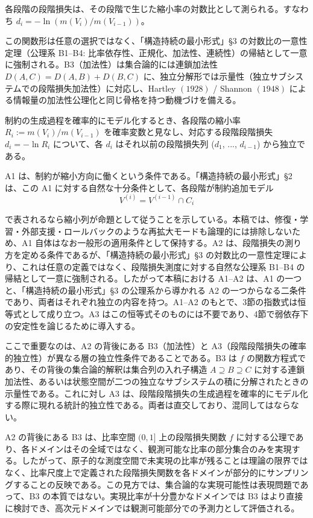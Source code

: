\documentclass[12pt,a4paper]{article}
\begin{document}
\begin{assumption}[A2]
各段階の段階損失は、その段階で生じた縮小率の対数比として測られる。すなわち
$d_i = -\ln(m(V_i)/m(V_{i-1}))$。

この関数形は任意の選択ではなく、「構造持続の最小形式」§3 の対数比の一意性定理（公理系 B1–B4: 比率依存性、正規化、加法性、連続性）の帰結として一意に強制される。B3（加法性）は集合論的には連鎖加法性
$D(A,C) = D(A,B) + D(B,C)$
に、独立分解形では示量性（独立サブシステムでの段階損失加法性）に対応し、Hartley $(1928)$ / Shannon $(1948)$ による情報量の加法性公理化と同じ骨格を持つ動機づけを備える。
\end{assumption}

\begin{assumption}[A3]
制約の生成過程を確率的にモデル化するとき、各段階の縮小率 $R_i := m(V_i)/m(V_{i-1})$ を確率変数と見なし、対応する段階段階損失 $d_i = -\ln R_i$ について、各 $d_i$ はそれ以前の段階損失列 ($d_1$, ..., $d_{i-1}$) から独立である。
\end{assumption}

A1 は、制約が縮小方向に働くという条件である。「構造持続の最小形式」§2 は、この A1 に対する自然な十分条件として、各段階が制約追加モデル \[
V^{(i)} = V^{(i-1)} ∩ C_{i}
\]

で表されるなら縮小列が命題として従うことを示している。本稿では、修復・学習・外部支援・ロールバックのような再拡大モードも論理的には排除しないため、A1 自体はなお一般形の適用条件として保持する。A2 は、段階損失の測り方を定める条件であるが、「構造持続の最小形式」§3 の対数比の一意性定理により、これは任意の定義ではなく、段階損失測度に対する自然な公理系 B1--B4 の帰結として一意に強制される。したがって本稿における A1--A2 は、A1 の一つと、「構造持続の最小形式」§3 の公理系から導かれる A2 の一つからなる二条件であり、両者はそれぞれ独立の内容を持つ。A1--A2 のもとで、3節の指数式は恒等式として成り立つ。A3 はこの恒等式そのものには不要であり、4節で弱依存下の安定性を論じるために導入する。

ここで重要なのは、A2 の背後にある B3（加法性）と A3（段階段階損失の確率的独立性）が異なる層の独立性条件であることである。B3 は \(f\) の関数方程式であり、その背後の集合論的解釈は集合列の入れ子構造 \(A \supseteq B \supseteq C\) に対する連鎖加法性、あるいは状態空間が二つの独立なサブシステムの積に分解されたときの示量性である。これに対し A3 は、段階段階損失の生成過程を確率的にモデル化する際に現れる統計的独立性である。両者は直交しており、混同してはならない。

A2 の背後にある B3 は、比率空間 \((0,1]\) 上の段階損失関数 \(f\) に対する公理であり、各ドメインはその全域ではなく、観測可能な比率の部分集合のみを実現する。したがって、原子的な測度空間で未実現の比率が残ることは理論の限界ではなく、比率尺度上で定義された段階損失関数を各ドメインが部分的にサンプリングすることの反映である。この見方では、集合論的な実現可能性は表現問題であって、B3 の本質ではない。実現比率が十分豊かなドメインでは B3 はより直接に検討でき、高次元ドメインでは観測可能部分での予測力として評価される。
\end{document}

